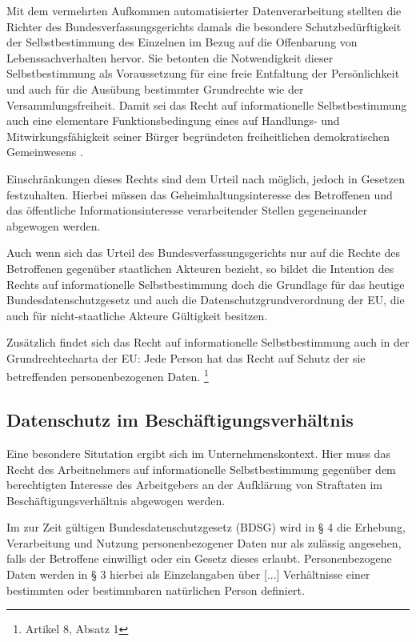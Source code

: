 Mit dem vermehrten Aufkommen automatisierter Datenverarbeitung stellten die Richter des Bundesverfassungsgerichts damals die besondere Schutzbedürftigkeit der Selbstbestimmung des Einzelnen im Bezug auf die Offenbarung von Lebenssachverhalten hervor. Sie betonten die Notwendigkeit dieser Selbstbestimmung als Voraussetzung für eine freie Entfaltung der Persönlichkeit und auch für die Ausübung bestimmter Grundrechte wie der Versammlungsfreiheit. Damit sei das Recht auf informationelle Selbstbestimmung auch \glqq eine elementare Funktionsbedingung eines auf Handlungs- und Mitwirkungsfähigkeit seiner Bürger begründeten freiheitlichen demokratischen Gemeinwesens\grqq{} \cite{TODO} .
    
Einschränkungen dieses Rechts sind dem Urteil nach möglich, jedoch in Gesetzen festzuhalten. Hierbei müssen das Geheimhaltungsinteresse des Betroffenen und das öffentliche Informationsinteresse verarbeitender Stellen gegeneinander abgewogen werden.

Auch wenn sich das Urteil des Bundesverfassungsgerichts nur auf die Rechte des Betroffenen gegenüber staatlichen Akteuren bezieht, so bildet die Intention des Rechts auf informationelle Selbstbestimmung doch die Grundlage für das heutige Bundesdatenschutzgesetz und auch die Datenschutzgrundverordnung der EU, die auch für nicht-staatliche Akteure Gültigkeit besitzen.

Zusätzlich findet sich das Recht auf informationelle Selbstbestimmung auch in der Grundrechtecharta der EU: \glqq Jede Person hat das Recht auf Schutz der sie betreffenden personenbezogenen Daten. \grqq{}\footnote{
  Artikel 8, Absatz 1
}

\subsection*{Datenschutz im Beschäftigungsverhältnis}

Eine besondere Situtation ergibt sich im Unternehmenskontext. Hier muss das Recht des Arbeitnehmers auf informationelle Selbstbestimmung gegenüber dem berechtigten Interesse des Arbeitgebers an der Aufklärung von Straftaten im Beschäftigungsverhältnis abgewogen werden. 

Im zur Zeit gültigen Bundesdatenschutzgesetz (BDSG) wird in § 4 die Erhebung, Verarbeitung und Nutzung personenbezogener Daten nur als zulässig angesehen, falls der Betroffene einwilligt oder ein Gesetz dieses erlaubt. Personenbezogene Daten werden in § 3 hierbei als \glqq Einzelangaben über [...] Verhältnisse einer bestimmten oder bestimmbaren natürlichen Person \grqq{}  definiert.

